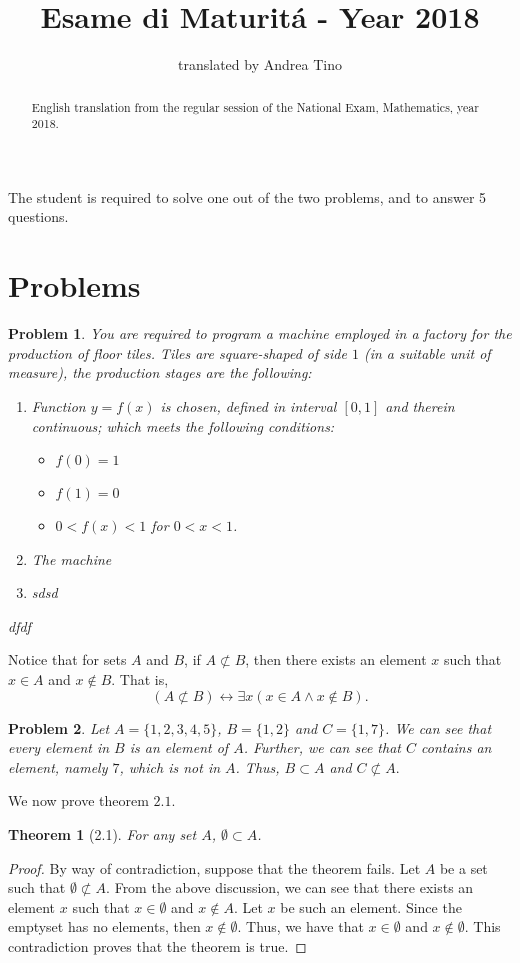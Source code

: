 \documentclass[a4paper,12pt,reqno]{amsart}
\title{Esame di Maturit\'a - Year 2018}
\author{translated by Andrea Tino}
\newtheorem*{theorem*}{Theorem}
\newtheorem{problem}{Problem}
\begin{document}
\begin{abstract}
English translation from the regular session of the National Exam, Mathematics, year 2018.
\end{abstract}

\maketitle

The student is required to solve one out of the two problems, and to answer 5 questions. 

\section{Problems}

\begin{problem}
You are required to program a machine employed in a factory for the production of floor tiles.
Tiles are square-shaped of side $1$ (in a suitable unit of measure), the production stages are the following:
\begin{enumerate}
\item Function $y=f(x)$ is chosen, defined in interval $[0,1]$ and therein continuous; which meets the following
conditions:
\begin{itemize}
\item $f(0) = 1$
\item $f(1) = 0$
\item $0 < f(x) < 1$ for $0 < x < 1$.
\end{itemize}
\item The machine
\item sdsd
\end{enumerate}
dfdf
\end{problem}

Notice that for sets $A$ and $B$, if $A \not\subset B$, then there exists an element $x$ such that $x \in A$ and $x \notin B$.  That is,
$$(A \not\subset B) \leftrightarrow \exists x ( x \in A \wedge x \notin B).$$

\begin{problem}
Let $A = \{ 1, 2, 3, 4, 5 \} $, $B = \{ 1, 2 \}$ and $C = \{ 1, 7 \}$.  We can see that every element in $B$ is an element of $A$.  Further, we can see that $C$ contains an element, namely $7$, which is not in $A$.  Thus, $B \subset A$ and $C \not\subset A.$
\end{problem}

We now prove theorem $2.1$.

\begin{theorem*}[2.1]
For any set $A$, $\emptyset \subset A$.
\end{theorem*}

\begin{proof}
By way of contradiction, suppose that the theorem fails.  Let $A$ be a set such that $\emptyset \not\subset A.$  From the above discussion, we can see that there exists an element $x$ such that $x \in \emptyset$ and $x \notin A$.  Let $x$ be such an element.  Since the emptyset has no elements, then $x \notin \emptyset$.  Thus, we have that $x \in \emptyset$ and $x \notin \emptyset.$ This contradiction proves that the theorem is true.
\end{proof}
\end{document}
